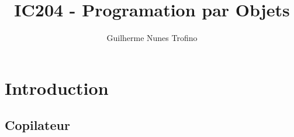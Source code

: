 \documentclass{article}
\title{IC204 - Programation par Objets}
\author{Guilherme Nunes Trofino}
\begin{document}
\maketitle

\newpage\tableofcontents

\section{Introduction}
\subsection{Copilateur}
\end{document}
